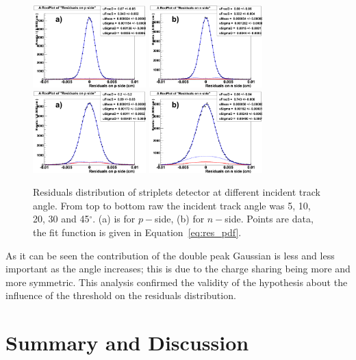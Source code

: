 \begin{figure}[!htpb]
\includegraphics[width=0.39\textwidth]{res_pside_30deg.pdf}
\includegraphics[width=0.39\textwidth]{res_nside_30deg.pdf}
\includegraphics[width=0.39\textwidth]{res_pside_45deg.pdf}
\includegraphics[width=0.39\textwidth]{res_nside_45deg.pdf}
\caption{\label{fig:res_angles}Residuals distribution of striplets detector at different incident track angle. From top to bottom raw the incident track angle was 5, 10, 20, 30 and 45$^{\circ}$. 
(a) is for $p-$side, (b) for $n-$side. Points are data, the fit function is given in Equation~\ref{eq:res_pdf}.}
\end{figure}

As it can be seen the contribution of the double peak Gaussian is less and less important as the 
angle increases; this is due to the charge sharing being more and more symmetric. This analysis 
confirmed the validity of the hypothesis about the influence of the threshold on the residuals 
distribution.


 \section{Summary and Discussion}
 \label{sec:Slim5Summary}
 
